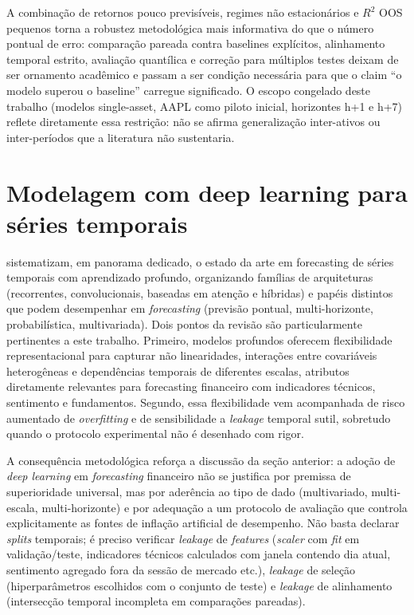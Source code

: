 A combinação de retornos pouco previsíveis, regimes não estacionários e $R^2$ OOS pequenos torna a robustez metodológica mais informativa do que o número pontual de erro: comparação pareada contra baselines explícitos, alinhamento temporal estrito, avaliação quantílica e correção para múltiplos testes deixam de ser ornamento acadêmico e passam a ser condição necessária para que o claim ``o modelo superou o baseline'' carregue significado. O escopo congelado deste trabalho (modelos single-asset, AAPL como piloto inicial, horizontes h+1 e h+7) reflete diretamente essa restrição: não se afirma generalização inter-ativos ou inter-períodos que a literatura não sustentaria.

\section{Modelagem com deep learning para séries temporais}
\cite{LIMZOHREN2021} sistematizam, em panorama dedicado, o estado da arte em forecasting de séries temporais com aprendizado profundo, organizando famílias de arquiteturas (recorrentes, convolucionais, baseadas em atenção e híbridas) e papéis distintos que podem desempenhar em \textit{forecasting} (previsão pontual, multi-horizonte, probabilística, multivariada). Dois pontos da revisão são particularmente pertinentes a este trabalho. Primeiro, modelos profundos oferecem flexibilidade representacional para capturar não linearidades, interações entre covariáveis heterogêneas e dependências temporais de diferentes escalas, atributos diretamente relevantes para forecasting financeiro com indicadores técnicos, sentimento e fundamentos. Segundo, essa flexibilidade vem acompanhada de risco aumentado de \textit{overfitting} e de sensibilidade a \textit{leakage} temporal sutil, sobretudo quando o protocolo experimental não é desenhado com rigor.

A consequência metodológica reforça a discussão da seção anterior: a adoção de \textit{deep learning} em \textit{forecasting} financeiro não se justifica por premissa de superioridade universal, mas por aderência ao tipo de dado (multivariado, multi-escala, multi-horizonte) e por adequação a um protocolo de avaliação que controla explicitamente as fontes de inflação artificial de desempenho. Não basta declarar \textit{splits} temporais; é preciso verificar \textit{leakage} de \textit{features} (\textit{scaler} com \textit{fit} em validação/teste, indicadores técnicos calculados com janela contendo dia atual, sentimento agregado fora da sessão de mercado etc.), \textit{leakage} de seleção (hiperparâmetros escolhidos com o conjunto de teste) e \textit{leakage} de alinhamento (intersecção temporal incompleta em comparações pareadas).


